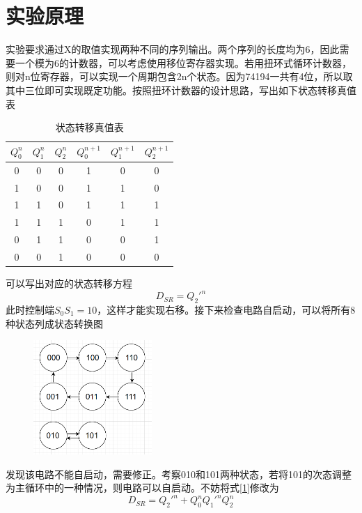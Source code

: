 \documentclass{ctexart}
\begin{document}
\section{实验原理}
实验要求通过X的取值实现两种不同的序列输出。两个序列的长度均为6，因此需要一个模为6的计数器，可以考虑使用移位寄存器实现。若用扭环式循环计数器，则对n位寄存器，可以实现一个周期包含2n个状态。因为74194一共有4位，所以取其中三位即可实现既定功能。按照扭环计数器的设计思路，写出如下状态转移真值表
\begin{table}[H]
    \centering
    \caption{状态转移真值表}
    \begin{tabular}{cccccc}
    \hline 
        $Q_0^n$ & $Q_1^n$ & $Q_2^n$ & $Q_0^{n+1}$ & $Q_1^{n+1}$ & $Q_2^{n+1}$ \\ \hline 
        0 & 0 & 0 & 1 & 0 & 0 \\
        1 & 0 & 0 & 1 & 1 & 0\\
        1 & 1 & 0 & 1 & 1 & 1 \\
        1 & 1 & 1 & 0 & 1 & 1\\ 
        0 & 1 & 1 & 0 & 0 & 1\\ 
        0 & 0 & 1 & 0 & 0 & 0\\ \hline
    \end{tabular}
    \label{状态转移真值表}
\end{table}
可以写出对应的状态转移方程
\begin{equation}\label{1}
    D_{SR}=Q_2'^{n}
\end{equation}
此时控制端$S_0S_1=10$，这样才能实现右移。接下来检查电路自启动，可以将所有8种状态列成状态转换图
\begin{figure}[H]
    \centering
    \includegraphics[width=0.4\textwidth]{不能自启动.png}
\end{figure}
发现该电路不能自启动，需要修正。考察010和101两种状态，若将101的次态调整为主循环中的一种情况，则电路可以自启动。不妨将式\ref{1}修改为
\begin{equation}
    D_{SR}=Q_2'^{n}+Q_0^n Q_1'^{n} Q_2^n
\end{equation}
\end{document}
